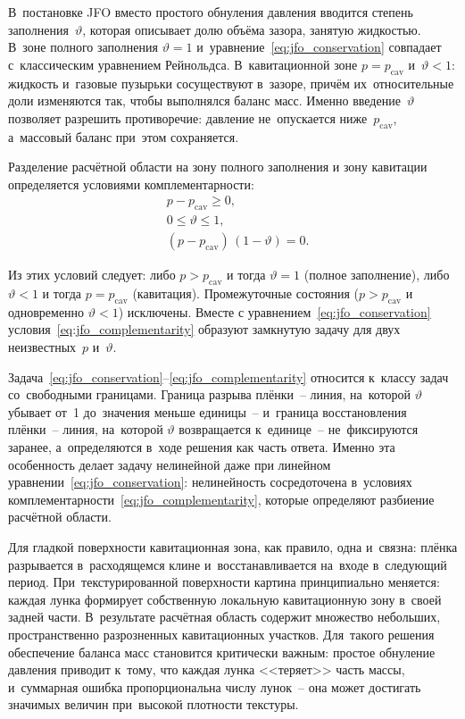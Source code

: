 В~постановке JFO вместо простого обнуления давления вводится степень заполнения~$\vartheta$, которая описывает долю объёма зазора, занятую жидкостью. В~зоне полного заполнения $\vartheta = 1$ и~уравнение~\eqref{eq:jfo_conservation} совпадает с~классическим уравнением Рейнольдса. В~кавитационной зоне $p = p_{\mathrm{cav}}$ и~$\vartheta < 1$: жидкость и~газовые пузырьки сосуществуют в~зазоре, причём их~относительные доли изменяются так, чтобы выполнялся баланс масс. Именно введение~$\vartheta$ позволяет разрешить противоречие: давление не~опускается ниже~$p_{\mathrm{cav}}$, а~массовый баланс при~этом сохраняется.

Разделение расчётной области на зону полного заполнения и зону
кавитации определяется условиями комплементарности:
\begin{equation}\label{eq:jfo_complementarity}
  \begin{aligned}
    &p - p_{\mathrm{cav}} \geq 0, \\
    &0 \leq \vartheta \leq 1, \\
    &(p - p_{\mathrm{cav}})\,(1 - \vartheta) = 0.
  \end{aligned}
\end{equation}

Из этих условий следует: либо $p > p_{\mathrm{cav}}$ и тогда
$\vartheta = 1$ (полное заполнение), либо $\vartheta < 1$ и тогда
$p = p_{\mathrm{cav}}$ (кавитация).  Промежуточные состояния
($p > p_{\mathrm{cav}}$ и одновременно $\vartheta < 1$) исключены.
Вместе с уравнением~\eqref{eq:jfo_conservation}
условия~\eqref{eq:jfo_complementarity} образуют замкнутую задачу
для двух неизвестных~$p$ и~$\vartheta$.

Задача~\eqref{eq:jfo_conservation}--\eqref{eq:jfo_complementarity} относится к~классу задач со~свободными границами. Граница разрыва плёнки~-- линия, на~которой $\vartheta$ убывает от~1 до~значения меньше единицы~-- и~граница восстановления плёнки~-- линия, на~которой $\vartheta$ возвращается к~единице~-- не~фиксируются заранее, а~определяются в~ходе решения как часть ответа. Именно эта особенность делает задачу нелинейной даже при линейном уравнении~\eqref{eq:jfo_conservation}: нелинейность сосредоточена в~условиях комплементарности~\eqref{eq:jfo_complementarity}, которые определяют разбиение расчётной области.

Для гладкой поверхности кавитационная зона, как правило, одна и~связна: плёнка разрывается в~расходящемся клине и~восстанавливается на~входе в~следующий период. При~текстурированной поверхности картина принципиально меняется: каждая лунка формирует собственную локальную кавитационную зону в~своей задней части. В~результате расчётная область содержит множество небольших, пространственно разрозненных кавитационных участков. Для~такого решения обеспечение баланса масс становится критически важным: простое обнуление давления приводит к~тому, что каждая лунка <<теряет>> часть массы, и~суммарная ошибка пропорциональна числу лунок~-- она может достигать значимых величин при~высокой плотности текстуры.

